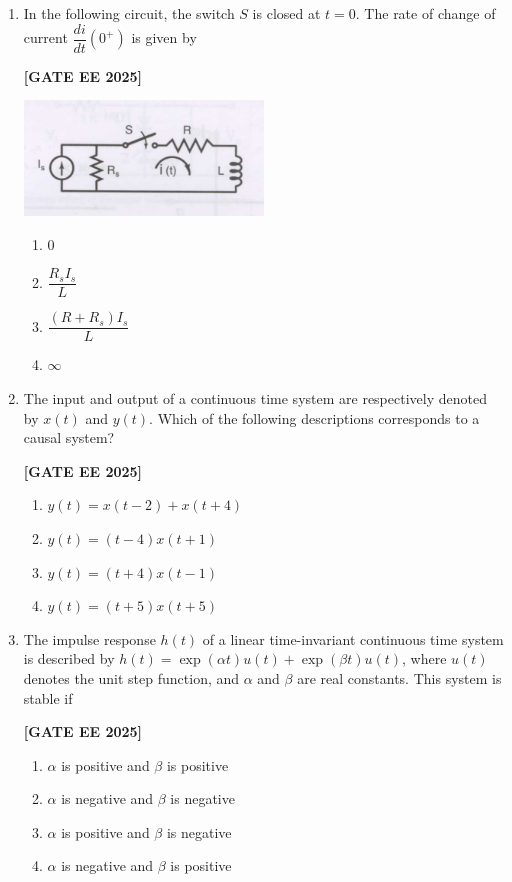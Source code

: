 \documentclass[12pt]{article}
\begin{document}
\begin{enumerate}[leftmargin=2.5em, label=\textbf{Q.\arabic*}., itemsep=2em]
\item In the following circuit, the switch $S$ is closed at $t = 0$. The rate of change of current $\dfrac{di}{dt}(0^+)$ is given by
 
\noindent \textbf{[GATE EE 2025]}
\begin{center}
\includegraphics[width=0.5\textwidth]{figs/q8.png}
\end{center}
\begin{enumerate}[label=(\Alph*)]
    \item 0
    \item $\dfrac{R_s I_s}{L}$
    \item $\dfrac{(R+R_s) I_s}{L}$
    \item $\infty$
\end{enumerate}

\item The input and output of a continuous time system are respectively denoted by $x(t)$ and $y(t)$. Which of the following descriptions corresponds to a causal system?
 
\noindent \textbf{[GATE EE 2025]}
\begin{enumerate}[label=(\Alph*)]
    \item $y(t) = x(t-2) + x(t+4)$
    \item $y(t) = (t-4) x(t+1)$
    \item $y(t) = (t+4) x(t-1)$
    \item $y(t) = (t+5) x(t+5)$
\end{enumerate}

\item The impulse response $h(t)$ of a linear time-invariant continuous time system is described by $h(t) = \exp(\alpha t) u(t) + \exp(\beta t) u(t)$, where $u(t)$ denotes the unit step function, and $\alpha$ and $\beta$ are real constants. This system is stable if
 
\noindent \textbf{[GATE EE 2025]}
\begin{enumerate}[label=(\Alph*)]
    \item $\alpha$ is positive and $\beta$ is positive
    \item $\alpha$ is negative and $\beta$ is negative
    \item $\alpha$ is positive and $\beta$ is negative
    \item $\alpha$ is negative and $\beta$ is positive
\end{enumerate}


\end{enumerate}
\end{document}
